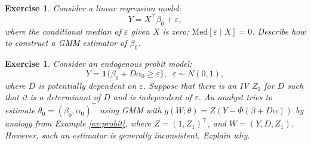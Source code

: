 \documentclass[10.5pt, A4paper, openany, uplatex]{book}
\newcommand{\mbf}{\mathbf}
\newcommand{\eps}{\varepsilon}
\newtheorem{exercise}[theorem]{Exercise}
\numberwithin{equation}{section}
\begin{document}
\begin{framed}
\begin{exercise}\upshape
	Consider a linear regression model:
	\[
	Y = X^\top \beta_0 + \eps,
	\]
	where the conditional median of $\eps$ given $X$ is zero: $\text{Med}[\eps \mid X] = 0$.
	Describe how to construct a GMM estimator of $\beta_0$. 
\end{exercise}

\begin{exercise}\upshape
	Consider an endogenous probit model:
	\[
		Y = \mbf{1}\{\beta_0 + D \alpha_0 \ge \eps\}, \;\; \eps \sim N(0,1),
	\]
	where $D$ is potentially dependent on $\eps$.
	Suppose that there is an IV $Z_1$ for $D$ such that it is a determinant of $D$ and is independent of $\eps$. 
	An analyst tries to estimate $\theta_0 = (\beta_0, \alpha_0)^\top$ using GMM with $g(W; \theta) = Z(Y - \Phi(\beta + D \alpha))$ by analogy from Example \ref{ex:probit}, where $Z = (1, Z_1)^\top$, and $W = (Y,D,Z_1)$.
	However, such an estimator is generally inconsistent.
	Explain why.
\end{exercise}
\end{framed}
\end{document}
